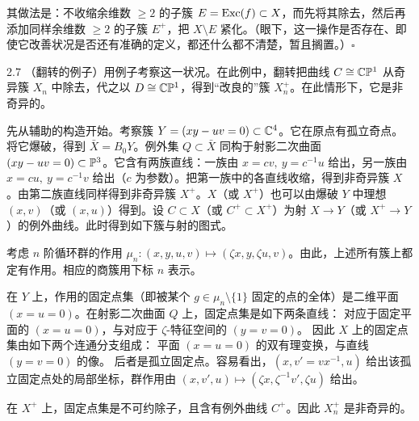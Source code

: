 其做法是：不收缩余维数 $\ge 2$ 的子簇 $E=\operatorname{Exc}(f)\subset X$，而先将其除去，然后再添加同样余维数 $\ge 2$ 的子簇 $E^+$，把 $X\setminus E$ 紧化。（眼下，这一操作是否存在、即使它改善状况是否还有准确的定义，都还什么都不清楚，暂且搁置。）\hfill$\square$

\begin{example}{2.7}
（翻转的例子）用例子考察这一状况。在此例中，翻转把曲线 $C\cong\mathbb{C}\mathbb{P}^1$ 从奇异簇 $X_n$ 中除去，代之以 $D\cong\mathbb{C}\mathbb{P}^1$，得到“改良的”簇 $X^+_n$。在此情形下，它是非奇异的。

先从辅助的构造开始。考察簇 $Y=(xy-uv=0)\subset\mathbb{C}^4$。它在原点有孤立奇点。将它爆破，得到 $\bar X=B_0Y$。例外集 $Q\subset\bar X$ 同构于射影二次曲面 $(xy-uv=0)\subset\mathbb{P}^3$。它含有两族直线：一族由 $x=cv,\ y=c^{-1}u$ 给出，另一族由 $x=cu,\ y=c^{-1}v$ 给出（$c$ 为参数）。把第一族中的各直线收缩，得到非奇异簇 $X$。由第二族直线同样得到非奇异簇 $X^+$。$X$（或 $X^+$）也可以由爆破 $Y$ 中理想 $(x,v)$（或 $(x,u)$）得到。设 $C\subset X$（或 $C^+\subset X^+$）为射 $X\to Y$（或 $X^+\to Y$）的例外曲线。此时得到如下簇与射的图式。

\begin{center}
\end{center}

考虑 $n$ 阶循环群的作用 $\mu_n\colon(x,y,u,v)\mapsto(\zeta x,y,\zeta u,v)$。由此，上述所有簇上都定有作用。相应的商簇用下标 $n$ 表示。

在 $Y$ 上，作用的固定点集（即被某个 $g\in\mu_n\setminus\{1\}$ 固定的点的全体）是二维平面 $(x=u=0)$。在射影二次曲面 $Q$ 上，固定点集是如下两条直线：
对应于固定平面的 $(x=u=0)$，与对应于 $\zeta$-特征空间的 $(y=v=0)$。
因此 $X$ 上的固定点集由如下两个连通分支组成：
平面 $(x=u=0)$ 的双有理变换，与直线 $(y=v=0)$ 的像。
后者是孤立固定点。容易看出，$(x,v'=vx^{-1},u)$ 给出该孤立固定点处的局部坐标，群作用由 $(x,v',u)\mapsto(\zeta x,\zeta^{-1}v',\zeta u)$ 给出。

在 $X^+$ 上，固定点集是不可约除子，且含有例外曲线 $C^+$。因此 $X^+_n$ 是非奇异的。

\begin{figure}[htbp]
\centering
\resizebox{0.72\textwidth}{!}{}
\end{figure}


\end{example}
